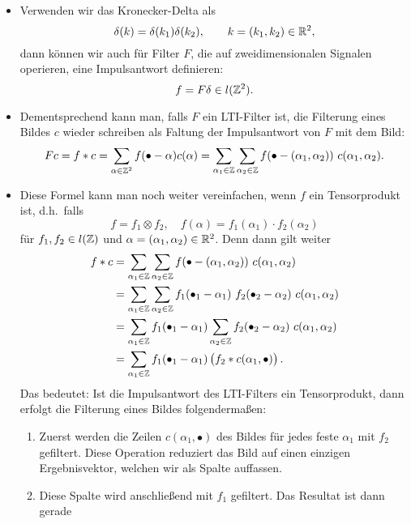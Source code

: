 \begin{remark}\leavevmode
\begin{itemize}
\item Verwenden wir das Kronecker-Delta als
  \[
    \delta(k) = \delta(k_{1}) \delta({k_{2}}), \qquad k = (k_{1}, k_{2}) \in \mathbb{R}^{2},
  \]
  dann können wir auch für Filter $ F $, die auf zweidimensionalen Signalen operieren, eine 
  Impulsantwort definieren:
  \[
    f = F\delta \in l(\mathbb{Z}^{2}).
  \]
\item Dementsprechend kann man, falls $ F $ ein LTI-Filter ist, die Filterung eines Bildes $ c $ 
  wieder schreiben als Faltung der Impulsantwort von $ F $ mit dem Bild:
  \[
      Fc 
    = f * c
    = \sum_{\alpha \in \mathbb{Z}^{2}} f(\bullet - \alpha) c(\alpha)
    = \sum_{\alpha_{1} \in \mathbb{Z}} \sum_{\alpha_{2} \in \mathbb{Z}}
        f(\bullet - (\alpha_{1}, \alpha_{2})) \ c(\alpha_{1}, \alpha_{2}).
  \]
\item Diese Formel kann man noch weiter vereinfachen, wenn $ f $ ein Tensorprodukt ist, d.h.\ falls
  \[
    f = f_{1} \otimes f_{2}, \quad f(\alpha) = f_{1}(\alpha_{1}) \cdot f_{2}(\alpha_{2})
  \]
  für $ f_{1}, f_{2} \in l(\mathbb{Z}) $ und $ \alpha = (\alpha_{1}, \alpha_{2}) \in \mathbb{R}^{2} $. Denn dann
  gilt weiter
  \begin{align*}
     f * c
  &= \sum_{\alpha_{1} \in \Z} \sum_{\alpha_{2} \in \Z}
        f(\bullet - (\alpha_{1}, \alpha_{2})) \ c(\alpha_{1}, \alpha_{2}) \\
  &= \sum_{\alpha_{1} \in \Z} \sum_{\alpha_{2} \in \Z} 
        f_{1}(\bullet_{1} - \alpha_{1}) \ f_{2}(\bullet_{2} - \alpha_{2}) \ 
        c(\alpha_{1}, \alpha_{2}) \\
  &= \sum_{\alpha_{1} \in \Z} f_{1}(\bullet_{1} - \alpha_{1})
        \sum_{\alpha_{2} \in \Z} f_{2}(\bullet_{2} - \alpha_{2}) \ c(\alpha_{1}, \alpha_{2}) \\
  &= \sum_{\alpha_{1} \in \Z} f_{1}(\bullet_{1} - \alpha_{1})
        \left( f_{2} * c(\alpha_{1}, \bullet) \right).
  \end{align*}
  Das bedeutet: Ist die Impulsantwort des LTI-Filters ein Tensorprodukt, dann erfolgt die Filterung
  eines Bildes folgendermaßen: 
  \begin{enumerate}
  \item Zuerst werden die Zeilen $ c(\alpha_{1}, \bullet) $ des Bildes für jedes feste
    $ \alpha_{1} $ mit $ f_{2} $ gefiltert. Diese Operation reduziert das Bild auf einen
    einzigen Ergebnisvektor, welchen wir als Spalte auffassen.
  \item Diese Spalte wird anschließend mit $ f_{1} $ gefiltert. Das Resultat ist dann gerade 

\end{enumerate}
\end{itemize}
\end{remark}
